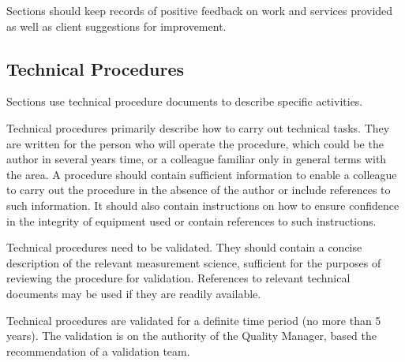 Sections should keep records of positive feedback on work and services provided as well as client suggestions for improvement.

\subsection{Technical Procedures}
\label{ss:technical_procedures}
Sections use technical procedure documents to describe specific activities.

Technical procedures primarily describe how to carry out technical tasks. They are written for the person who will operate the procedure, which could be the author in several years time, or a colleague familiar only in general terms with the area. A procedure should contain sufficient information to enable a colleague to carry out the procedure in the absence of the author or include references to such information. It should also contain instructions on how to ensure confidence in the integrity of equipment used or contain references to such instructions.

Technical procedures need to be validated. They should contain a concise description of the relevant measurement science, sufficient for the purposes of reviewing the procedure for validation. References to relevant technical documents may be used if they are readily available. 

Technical procedures are validated for a definite time period (no more than 5 years). The validation is on the authority of the Quality Manager, based the recommendation of a validation team. 

